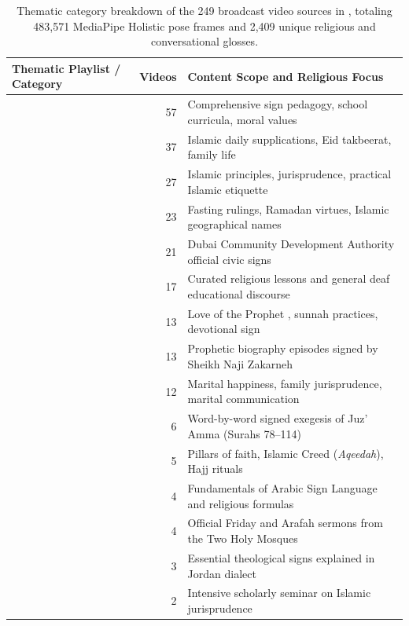 \begin{table}[ht]
\centering\small
\caption{Thematic category breakdown of the 249 broadcast video sources in , totaling 483,571 MediaPipe Holistic pose frames and 2,409 unique religious and conversational glosses.}
\label{tab:new_sources_categories}
\begin{tabularx}{\textwidth}{L{4.2cm} r L{5.8cm}}
\toprule
Thematic Playlist / Category & Videos & Content Scope and Religious Focus \\
\midrule
{} & 57 & Comprehensive sign pedagogy, school curricula, moral values \\
 & 37 & Islamic daily supplications, Eid takbeerat, family life \\
 & 27 & Islamic principles, jurisprudence, practical Islamic etiquette \\
 & 23 & Fasting rulings, Ramadan virtues, Islamic geographical names \\
 & 21 & Dubai Community Development Authority official civic signs \\
 & 17 & Curated religious lessons and general deaf educational discourse \\
 & 13 & Love of the Prophet , sunnah practices, devotional sign \\
 & 13 & Prophetic biography episodes signed by Sheikh Naji Zakarneh \\
 & 12 & Marital happiness, family jurisprudence, marital communication \\
 & 6 & Word-by-word signed exegesis of Juz' Amma (Surahs 78--114) \\
 & 5 & Pillars of faith, Islamic Creed (\emph{Aqeedah}), Hajj rituals \\
 & 4 & Fundamentals of Arabic Sign Language and religious formulas \\
 & 4 & Official Friday and Arafah sermons from the Two Holy Mosques \\
 & 3 & Essential theological signs explained in Jordan dialect \\
 & 2 & Intensive scholarly seminar on Islamic jurisprudence \\

\end{tabularx}
\end{table}
